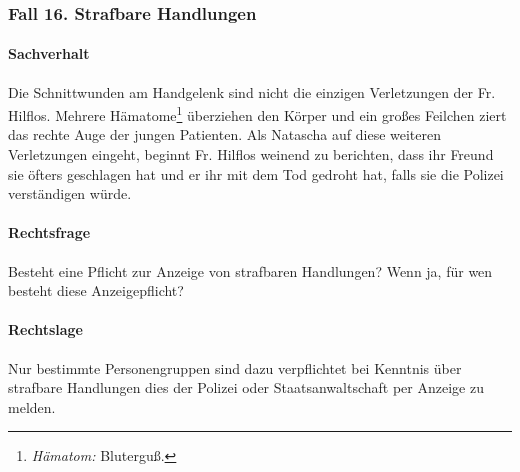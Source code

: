 \subsubsection{Fall 16. Strafbare Handlungen}

\paragraph*{Sachverhalt}

Die Schnittwunden am Handgelenk sind nicht die einzigen Verletzungen der
Fr. Hilflos. Mehrere Hämatome\footnote{\emph{Hämatom:}
Bluterguß.} \"uberziehen den K\"orper und ein gro{\ss}es
Feilchen ziert das rechte Auge der jungen Patienten. Als Natascha auf diese weiteren Verletzungen
eingeht, beginnt Fr. Hilflos weinend zu berichten, dass ihr Freund sie \"ofters geschlagen hat und er ihr mit
dem Tod gedroht hat, falls sie die Polizei verständigen w\"urde.

\paragraph*{Rechtsfrage}

Besteht eine Pflicht zur Anzeige von strafbaren Handlungen? Wenn ja,
f\"ur wen besteht diese Anzeigepflicht?

\paragraph*{Rechtslage}

{\mdseries
{}}

Nur bestimmte Personengruppen sind dazu verpflichtet bei Kenntnis \"uber
strafbare Handlungen dies der Polizei oder Staatsanwaltschaft per
Anzeige zu melden.


